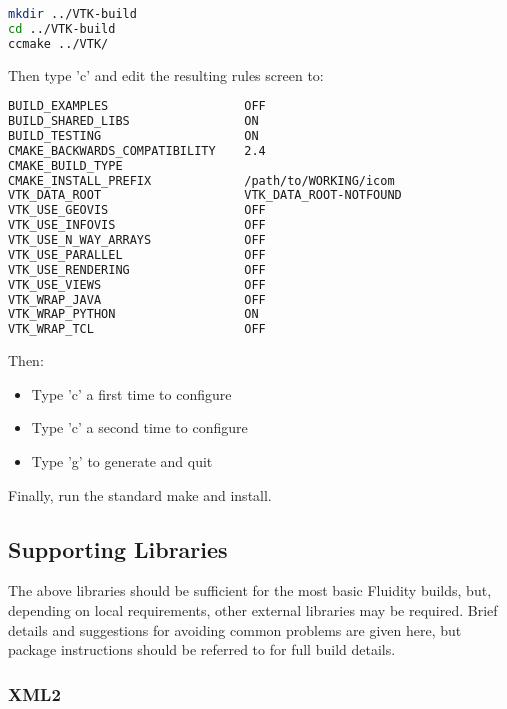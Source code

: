 \begin{lstlisting}[language=bash]
mkdir ../VTK-build
cd ../VTK-build
ccmake ../VTK/
\end{lstlisting}

Then type 'c' and edit the resulting rules screen to:

\begin{lstlisting}[language=bash]
BUILD_EXAMPLES                   OFF
BUILD_SHARED_LIBS                ON                                     
BUILD_TESTING                    ON
CMAKE_BACKWARDS_COMPATIBILITY    2.4
CMAKE_BUILD_TYPE
CMAKE_INSTALL_PREFIX             /path/to/WORKING/icom          
VTK_DATA_ROOT                    VTK_DATA_ROOT-NOTFOUND
VTK_USE_GEOVIS                   OFF                                    
VTK_USE_INFOVIS                  OFF                                    
VTK_USE_N_WAY_ARRAYS             OFF
VTK_USE_PARALLEL                 OFF
VTK_USE_RENDERING                OFF                                    
VTK_USE_VIEWS                    OFF                                    
VTK_WRAP_JAVA                    OFF
VTK_WRAP_PYTHON                  ON                                     
VTK_WRAP_TCL                     OFF
\end{lstlisting}

Then:

\begin{itemize}
  \item Type 'c' a first time to configure
  \item Type 'c' a second time to configure
  \item Type 'g' to generate and quit
\end{itemize}

Finally, run the standard make and install.

\subsection{Supporting Libraries}
\label{sec:required_libraries_supporting}

The above libraries should be sufficient for the most basic Fluidity builds,
but, depending on local requirements, other external libraries may be required.
Brief details and suggestions for avoiding common problems are given here, but
package instructions should be referred to for full build details.

\subsubsection{XML2}
\label{sec:required_libraries_supporting_xml2}

